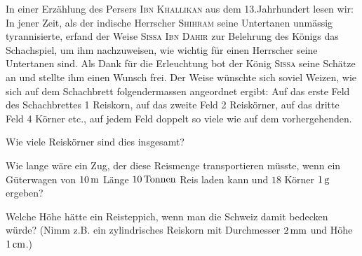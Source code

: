 \documentclass[%
11pt,%
twoside,%
titlepage,%
german,%
headsepline%
]{scrartcl}
\begin{document}
\begin{ueb}
In
einer Erz\"ahlung des Persers \textsc{Ibn Khallikan} aus dem 13.Jahrhundert lesen wir: \glqq In jener Zeit, als der indische Herrscher \textsc{Shihram} seine Untertanen unm\"assig tyrannisierte, erfand der Weise \textsc{Sissa Ibn Dahir} zur Belehrung des K\"onigs das Schachspiel, um ihm nachzuweisen, wie wichtig f\"ur einen Herrscher seine Untertanen sind. Als Dank f\"ur die Erleuchtung bot der K\"onig \textsc{Sissa} seine Sch\"atze an und stellte ihm einen Wunsch frei. Der Weise w\"unschte sich soviel Weizen, wie sich auf dem Schachbrett folgendermassen angeordnet ergibt: Auf das erste Feld des Schachbrettes 1 Reiskorn, auf das zweite Feld 2 Reisk\"orner, auf das dritte Feld 4 K\"orner etc., auf jedem Feld doppelt so viele wie auf dem vorhergehenden.\grqq
\begin{enumeratea}
\item Wie viele Reisk\"orner sind dies insgesamt?
\item Wie lange w\"are ein Zug, der diese Reismenge transportieren m\"usste, wenn ein G\"uterwagen von $\unit[10]{m}$ L\"ange $\unit[10]{Tonnen}$ Reis laden kann und  $18$ K\"orner $\unit[1]{g}$ ergeben?
\item Welche H\"ohe h\"atte ein Reisteppich, wenn man die Schweiz damit bedecken w\"urde? (Nimm z.B. ein zylindrisches Reiskorn mit Durchmesser $\unit[2]{mm}$ und H\"ohe $\unit[1]{cm}$.)
\end{enumeratea}
\end{ueb}
\end{document}
